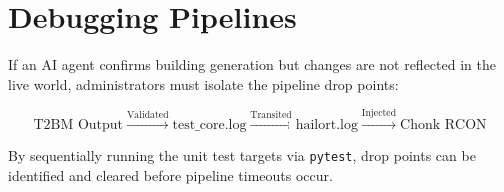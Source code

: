 \section{Debugging Pipelines}
If an AI agent confirms building generation but changes are not reflected in the live world, administrators must isolate the pipeline drop points:

\begin{equation}
    \text{T2BM Output} \xrightarrow{\text{Validated}} \text{test\_core.log} \xrightarrow{\text{Transited}} \text{hailort.log} \xrightarrow{\text{Injected}} \text{Chonk RCON}
\end{equation}

By sequentially running the unit test targets via \texttt{pytest}, drop points can be identified and cleared before pipeline timeouts occur.